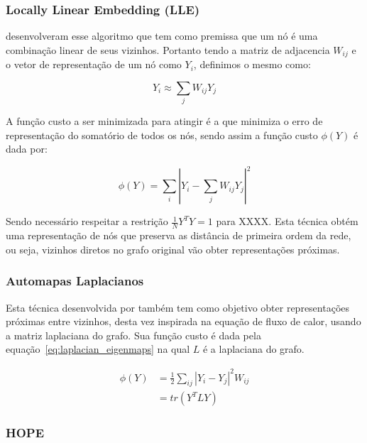 \subsubsection{Locally Linear Embedding (LLE)}

\citet{roweis00} desenvolveram esse algoritmo que tem como premissa que um nó é
uma combinação linear de seus vizinhos.
Portanto tendo a matriz de adjacencia $W_{ij}$ e o vetor de representação de um
nó como $Y_i$, definimos o mesmo como:

\begin{equation}
    Y_i \approx \sum_j{W_{ij}Y_j}
\end{equation}

A função custo a ser minimizada para atingir é a que minimiza o erro de
representação do somatório de todos os nós, sendo assim a função custo $\phi(Y)$
é dada por:

\begin{equation}
    \phi(Y) = \sum_i{|Y_i - \sum_j{W_{ij}Y_j}|^2}
\end{equation}

Sendo necessário respeitar a restrição $\frac{1}{N}Y^TY = 1$ para XXXX.
Esta técnica obtém uma representação de nós que preserva as distância de
primeira ordem da rede, ou seja, vizinhos diretos no grafo original vão obter
representações próximas.

\subsubsection{Automapas Laplacianos}

Esta técnica desenvolvida por \citet{belkin02} também tem como objetivo obter
representações próximas entre vizinhos, desta vez inspirada na equação de fluxo
de calor, usando a matriz laplaciana do grafo.
Sua função custo é dada pela equação~\ref{eq:laplacian_eigenmaps} na qual $L$ é
a laplaciana do grafo.

\begin{equation} \label{eq:laplacian_eigenmaps}
\begin{aligned}
    \phi(Y) &= \frac{1}{2} \sum_{ij}{|Y_i - Y_j|^2 W_{ij}} \\
            &= tr(Y^TLY)
\end{aligned}
\end{equation}

\subsubsection{HOPE}

